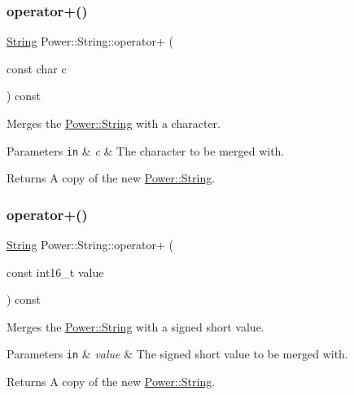 \subsubsection{\texorpdfstring{operator+()}{operator+()}\hspace{0.1cm}{\footnotesize\ttfamily [3/11]}}
{\footnotesize\ttfamily \hyperlink{class_power_1_1_string}{String} Power\+::\+String\+::operator+ (\begin{DoxyParamCaption}\item[{const char}]{c }\end{DoxyParamCaption}) const\hspace{0.3cm}{\ttfamily [inline]}}



Merges the \hyperlink{class_power_1_1_string}{Power\+::\+String} with a character. 


\begin{DoxyParams}[1]{Parameters}
\mbox{\tt in}  & {\em c} & The character to be merged with. \\
\hline
\end{DoxyParams}
\begin{DoxyReturn}{Returns}
A copy of the new \hyperlink{class_power_1_1_string}{Power\+::\+String}. 
\end{DoxyReturn}
\mbox{\label{class_power_1_1_string_ad650c3d76fd2ff718f2ee0dd6b9945de}} 
\subsubsection{\texorpdfstring{operator+()}{operator+()}\hspace{0.1cm}{\footnotesize\ttfamily [4/11]}}
{\footnotesize\ttfamily \hyperlink{class_power_1_1_string}{String} Power\+::\+String\+::operator+ (\begin{DoxyParamCaption}\item[{const int16\+\_\+t}]{value }\end{DoxyParamCaption}) const\hspace{0.3cm}{\ttfamily [inline]}}



Merges the \hyperlink{class_power_1_1_string}{Power\+::\+String} with a signed short value. 


\begin{DoxyParams}[1]{Parameters}
\mbox{\tt in}  & {\em value} & The signed short value to be merged with. \\
\hline
\end{DoxyParams}
\begin{DoxyReturn}{Returns}
A copy of the new \hyperlink{class_power_1_1_string}{Power\+::\+String}. 
\end{DoxyReturn}
\mbox{\label{class_power_1_1_string_a6efb41ecb5b26be77e91fba85a286538}} 
